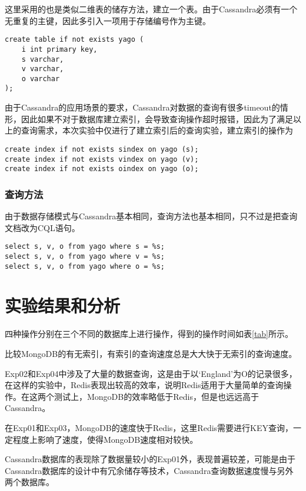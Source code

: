 \documentclass[12pt]{ctexart}
\begin{document}
这里采用的也是类似二维表的储存方法，建立一个表。由于Cassandra必须有一个无重复的主键，因此多引入一项用于存储编号作为主键。
\begin{verbatim}
create table if not exists yago (
    i int primary key,
    s varchar,
    v varchar,
    o varchar
);
\end{verbatim}
由于Cassandra的应用场景的要求，Cassandra对数据的查询有很多timeout的情形，因此如果不对于数据库建立索引，会导致查询操作超时报错，因此为了满足以上的查询需求，本次实验中仅进行了建立索引后的查询实验，建立索引的操作为
\begin{verbatim}
create index if not exists sindex on yago (s);
create index if not exists vindex on yago (v);
create index if not exists oindex on yago (o);
\end{verbatim}

\subsubsection{查询方法}

由于数据存储模式与Cassandra基本相同，查询方法也基本相同，只不过是把查询文档改为CQL语句。
\begin{verbatim}
select s, v, o from yago where s = %s;
select s, v, o from yago where v = %s;
select s, v, o from yago where o = %s;
\end{verbatim}

\section{实验结果和分析}

四种操作分别在三个不同的数据库上进行操作，得到的操作时间如表\ref{tab}所示。

比较MongoDB的有无索引，有索引的查询速度总是大大快于无索引的查询速度。

Exp02和Exp04中涉及了大量的数据查询，这是由于以`England'为O的记录很多，在这样的实验中，Redis表现出较高的效率，说明Redis适用于大量简单的查询操作。在这两个测试上，MongoDB的效率略低于Redis，但是也远远高于Cassandra。

在Exp01和Exp03，MongoDB的速度快于Redis，这里Redis需要进行KEY查询，一定程度上影响了速度，使得MongoDB速度相对较快。

Cassandra数据库的表现除了数据量较小的Exp01外，表现普遍较差，可能是由于Cassandra数据库的设计中有冗余储存等技术，Cassandra查询数据速度慢与另外两个数据库。
\end{document}
